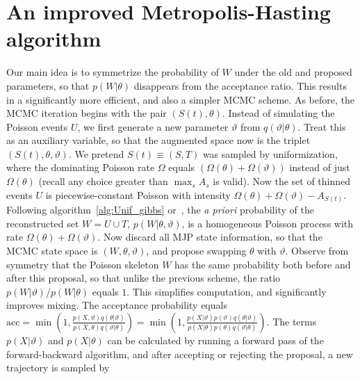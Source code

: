 
\section{An improved Metropolis-Hasting algorithm}
\vspace{-.05in}
Our main idea is to symmetrize the probability of $W$ under the old and 
proposed parameters, so that 
$p(W|\theta)$ disappears from the acceptance ratio. This results
in a significantly more efficient, and also a simpler MCMC scheme.
As before, the MCMC iteration begins with the pair $(S(t), \theta)$. 
Instead of simulating the Poisson events $U$, we first generate a new 
parameter $\vartheta$ from $q(\vartheta|\theta)$. Treat this as an 
auxiliary variable, so that the augmented space now is the triplet 
$(S(t), \theta,\vartheta)$. We pretend $S(t) \equiv (S,T)$ was sampled by  
uniformization, where the dominating Poisson rate $\Omega$ equals 
$(\Omega(\theta) + \Omega(\vartheta))$ instead of just $\Omega(\theta)$ 
(recall any choice greater than $\max_s A_s$ is valid).
Now the set of thinned events $U$ is piecewise-constant
Poisson with intensity $\Omega(\theta) + \Omega(\vartheta) - 
A_{S(t)}$. Following algorithm~\ref{alg:Unif_gibbs} or~\cite{RaoTeh13}, 
the {\em a priori} probability of the reconstructed set $W = U \cup T$, 
$p(W|\theta,\vartheta)$, is a homogeneous Poisson 
process with rate $\Omega(\theta) + \Omega(\vartheta)$. Now discard all 
MJP state information, so that the MCMC state space is $(W, \theta, \vartheta)$,
and propose swapping $\theta$ with $\vartheta$. 
Observe from
symmetry that the Poisson skeleton $W$ has the same probability both
before and after this proposal, so that unlike the previous scheme,
the ratio $p(W|\vartheta)/p(W|\theta)$ equals $1$.  This simplifies 
computation, and significantly improves mixing.
The acceptance probability 
equals
$ \text{acc} = 
  \min\left(1, \frac{p(X,\vartheta)q(\theta|\vartheta)}
   {p(X,\theta)q(\vartheta|\theta)}\right) = 
  \min\left(1, \frac{p(X|\vartheta)p(\vartheta)q(\theta|\vartheta)}
   {p(X|\theta)p(\theta)q(\vartheta|\theta)}\right).
   $
   The terms $p(X|\vartheta)$ and  $p(X|\theta)$ can be calculated by 
   running a forward pass of the forward-backward algorithm, and after
   accepting or rejecting the proposal, a new trajectory is sampled by

